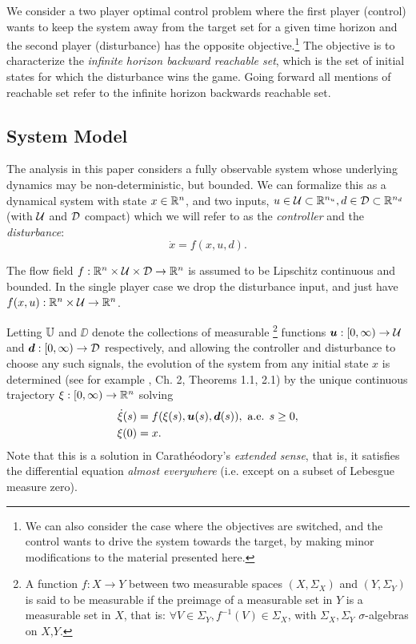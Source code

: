 
We consider a two player optimal control problem where the first player (control) wants to keep the system away from the target set for a given time horizon and the second player (disturbance) has the opposite objective.\footnote{We can also consider the case where the objectives are switched, and the control wants to drive the system towards the target, by making minor modifications to the material presented here.} The objective is to characterize the \emph{infinite horizon backward reachable set}, which is the set of initial states for which the disturbance wins the game. Going forward all mentions of reachable set refer to the infinite horizon backwards reachable set.

\subsection{System Model \label{subsec:dynamics}}

The analysis in this paper considers a fully observable system whose underlying dynamics may be non-deterministic, but bounded. 
We can formalize this as a dynamical system with state $x\in\mathbb{R}^n$, and two inputs, $u\in\mathcal{U}\subset\mathbb{R}^{n_u},  d\in\mathcal{D}\subset\mathbb{R}^{n_d}$
(with $\mathcal{U}$ and $\mathcal{D}$ compact)
which we will refer to as the \emph{controller} and the \emph{disturbance}:
\begin{equation}\label{fxud}
\dot{x} = f(x,u, d).
\end{equation}

The flow field $f: \mathbb{R}^n \times \mathcal{U} \times \mathcal{D}\rightarrow\mathbb{R}^n$ is assumed to be Lipschitz continuous and bounded. In the single player case we drop the disturbance input, and just have $f(x,u):\mathbb{R}^n \times \mathcal{U} \rightarrow\mathbb{R}^n$.

Letting $\mathbb{U} $ and $\DD$ denote the collections of measurable%
	\footnote{A function $f:X\to Y$ between two measurable spaces $(X,\Sigma_X)$ and $(Y,\Sigma_Y)$
	is said to be measurable if the preimage of a measurable set in $Y$ is a measurable set in $X$, that is:
	$\forall V\in\Sigma_Y, f^{-1}(V)\in\Sigma_X$, with $\Sigma_X,\Sigma_Y$ $\sigma$-algebras on $X$,$Y$.}
functions $\bm u: [0,\infty)\to \mathcal{U} $ and $\bm d: [0,\infty)\to \mathcal{D}$ respectively,
and allowing the controller and disturbance to choose any such signals,
the evolution of the system
from any initial state $x$
is determined (see for example \cite{Coddington1955}, Ch. 2, Theorems 1.1, 2.1) by the unique continuous trajectory $\xi:[0,\infty)\to\mathbb{R}^n$ solving
\begin{equation}\label{eq:xdot}
\begin{split}
\dot{\xi}(s) &= f(\xi(s),\bm{u}(s),\bm{d}(s)), \text{ a.e. }s\ge 0,\\
\xi(0) &= x.
\end{split}
\end{equation}
Note that this is a solution in Carath\'eodory's \emph{extended sense}, that is, it satisfies the differential equation \emph{almost everywhere} (i.e. except on a subset of Lebesgue measure zero).


